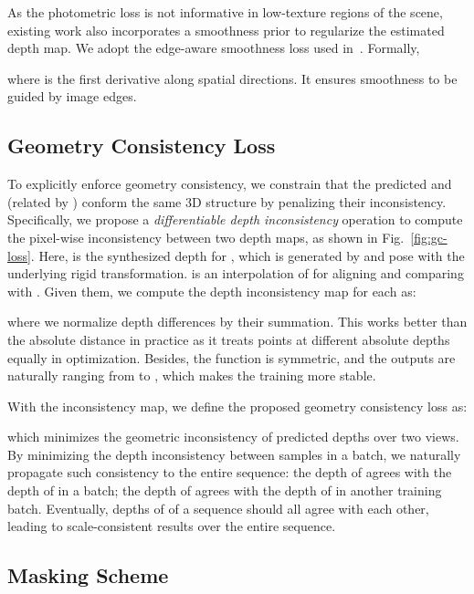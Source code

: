 \documentclass[twocolumn]{svjour3}
\renewcommand{\cite}[1]{\textcolor{blue}{\citep{#1}}}
\newcommand{\figref}[1]{Fig.~\ref{#1}}
\begin{document}
As the photometric loss is not informative in low-texture regions of the scene,
existing work also incorporates a smoothness prior to 
regularize the estimated depth map.
We adopt the edge-aware smoothness loss used in~\cite{ranjan2019cc}.
Formally,

where  is the first derivative along spatial directions. 
It ensures smoothness to be guided by image edges.



\subsection{Geometry Consistency Loss}\label{sec-gc}

To explicitly enforce geometry consistency, we constrain that the predicted  and  (related by ) 
conform the same 3D structure by penalizing their inconsistency.
Specifically, we propose a \emph{differentiable depth inconsistency} operation to compute the pixel-wise inconsistency between two depth maps, as shown in \figref{fig:gc-loss}.
Here,  is the synthesized depth for , which is generated by  and pose  with the underlying rigid transformation.
 is an interpolation of  for aligning and comparing with .
Given them, we compute the depth inconsistency map  for each 
 as:

where we normalize depth differences by their summation.
This works better than the absolute distance in practice as it treats points 
at different absolute depths equally in optimization.
Besides, the function is symmetric,
and the outputs are naturally ranging from  to , 
which makes the training more stable.

With the inconsistency map, 
we define the proposed geometry consistency loss as:

which minimizes the geometric inconsistency of predicted depths over two views.
By minimizing the depth inconsistency between samples in a batch, 
we naturally propagate such consistency to the entire sequence: 
the depth of  agrees with the depth of  in a batch; 
the depth of  agrees with the depth of  in another training batch. 
Eventually, depths of  of a sequence should all agree with each other,
leading to scale-consistent results over the entire sequence.





\subsection{Masking Scheme}
\end{document}
